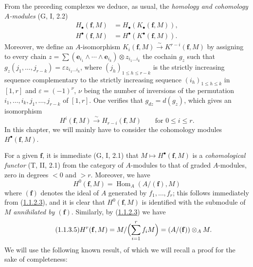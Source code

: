 \begin{env}[1.1.3]
\label{III.1.1.3}
From the preceding complexes we deduce, as usual, the \emph{homology and
cohomology $A$-modules} (G, I, 2.2)
\begin{align}
\label{III.1.1.3.1}
\tag{1.1.3.1}
H_\bullet(\mathbf f,M)&=H_\bullet(K_\bullet(\mathbf f,M)),\\
\label{III.1.1.3.2}
\tag{1.1.3.2}
H^\bullet(\mathbf f,M)&=H^\bullet(K^\bullet(\mathbf f,M)).
\end{align}
Moreover, we define an $A$-isomorphism
$K_i(\mathbf f,M)\xrightarrow{\sim}K^{r-i}(\mathbf f,M)$ by assigning to
every chain
$z=\sum(\mathbf e_{i_1}\wedge\cdots\wedge\mathbf e_{i_k})\otimes
z_{i_1\ldots i_k}$ the cochain $g_z$ such that
$g_z(j_1,\ldots,j_{r-k})=\varepsilon z_{i_1\ldots i_k}$, where
$(j_h)_{1\leq h\leq r-k}$ is the strictly increasing sequence complementary
to the strictly increasing sequence $(i_h)_{1\leq h\leq k}$ in $[1,r]$ and
$\varepsilon=(-1)^\nu$, $\nu$ being the number of inversions of the
permutation $i_1,\ldots,i_k,j_1,\ldots,j_{r-k}$ of $[1,r]$. One verifies that
$g_{dz}=d(g_z)$, which gives an isomorphism
\begin{equation}
\label{III.1.1.3.3}
\tag{1.1.3.3}
H^i(\mathbf f,M)\xrightarrow{\sim}H_{r-i}(\mathbf f,M)
\qquad\text{for }0\leq i\leq r.
\end{equation}
In this chapter, we will mainly have to consider the cohomology modules
$H^\bullet(\mathbf f,M)$.

For a given $\mathbf f$, it is immediate (G, I, 2.1) that
$M\mapsto H^\bullet(\mathbf f,M)$ is a \emph{cohomological functor}
(T, II, 2.1) from the category of $A$-modules to that of graded
$A$-modules, zero in degrees $<0$ and $>r$. Moreover, we have
\begin{equation}
\label{III.1.1.3.4}
\tag{1.1.3.4}
H^0(\mathbf f,M)=\operatorname{Hom}_A(A/(\mathbf f),M)
\end{equation}
where $(\mathbf f)$ denotes the ideal of $A$ generated by
$f_1,\ldots,f_r$; this follows immediately from
(\hyperref[III.1.1.2.3]{1.1.2.3}), and it is clear that
$H^0(\mathbf f,M)$ is identified with the submodule of $M$ \emph{annihilated
by $(\mathbf f)$}. Similarly, by
(\hyperref[III.1.1.2.3]{1.1.2.3}) we have
\begin{equation}
\label{III.1.1.3.5}
\tag{1.1.3.5}
H^r(\mathbf f,M)=M/\Bigl(\sum_{i=1}^r f_iM\Bigr)
=(A/(\mathbf f))\otimes_A M.
\end{equation}
We will use the following known result, of which we will recall a
proof for the sake of completeness:
\end{env}

